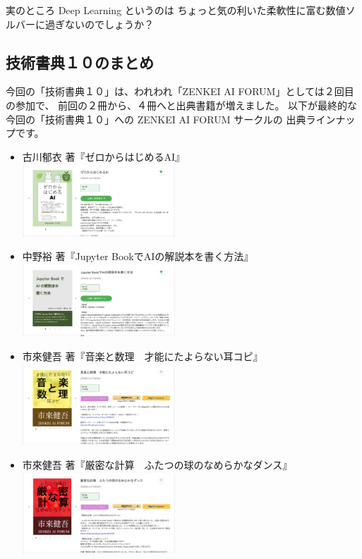 \documentclass[dvipdfmx,autodetect-engine,10pt,b5paper,papersize,openany,dvipsnames]{jsbook}
\begin{document}
\begin{multicols}{2}
実のところ Deep Learning というのは
ちょっと気の利いた柔軟性に富む数値ソルバーに過ぎないのでしょうか？


\subsection*{技術書典１０のまとめ}
今回の「技術書典１０」は、われわれ「ZENKEI AI FORUM」としては２回目の参加で、
前回の２冊から、４冊へと出典書籍が増えました。
以下が最終的な今回の「技術書典１０」への ZENKEI AI FORUM サークルの
出典ラインナップです。

\begin{itemize}
\item 古川郁衣 著『ゼロからはじめるAI』\\
  \includegraphics[width=0.45\textwidth]{images/202101/techbookfest-10-furukawa.jpg}
\item 中野裕 著『Jupyter BookでAIの解説本を書く方法』\\
  \includegraphics[width=0.45\textwidth]{images/202101/techbookfest-10-nakano.jpg}
\item 市來健吾 著『音楽と数理　才能にたよらない耳コピ』\\
  \includegraphics[width=0.45\textwidth]{images/202101/techbookfest-10-ichiki-1.jpg}
\item 市來健吾 著『厳密な計算　ふたつの球のなめらかなダンス』\\
  \includegraphics[width=0.45\textwidth]{images/202101/techbookfest-10-ichiki-2.jpg}
\end{itemize}


\end{multicols}
\end{document}
